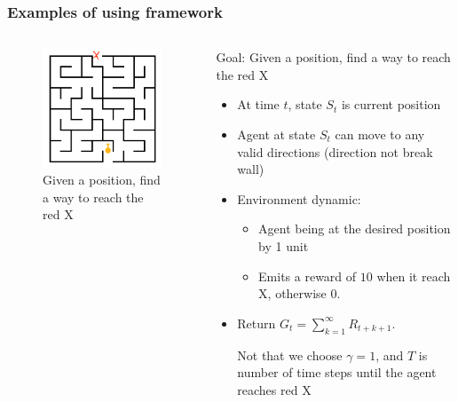 \documentclass[10pt]{beamer}
\theoremstyle{remark}
\begin{document}
\begin{frame}
    \frametitle{Examples of using framework}
    \begin{columns}
    \begin{column}{0.4\textwidth}
        \begin{figure}
            \includegraphics[width=\textwidth]{figures/maze.png}
            \caption{Given a position, find a way to reach the {\color{red} red X}}
        \end{figure}
    \end{column}
    \begin{column}{0.7\textwidth}  %
        Goal: Given a position, find a way to reach the {\color{red} red X}

        \begin{itemize}
            \item At time $t$, state $S_t$ is current position
            \item Agent at state $S_t$ can move to any valid directions (direction not break wall)
            \item Environment dynamic: 
                \begin{itemize}
                    \item Agent being at the desired position by 1 unit 
                    \item Emits a reward of $10$ when it reach X, otherwise $0$.
                \end{itemize}
            \item Return $G_t = \sum^{\infty}_{k=1} R_{t+k+1} $.

            Not that we choose $\gamma = 1$, and $T$ is number of time steps until the agent reaches {\color{red} red X}
        \end{itemize}
    \end{column}
    \end{columns}
\end{frame}
\end{document}
